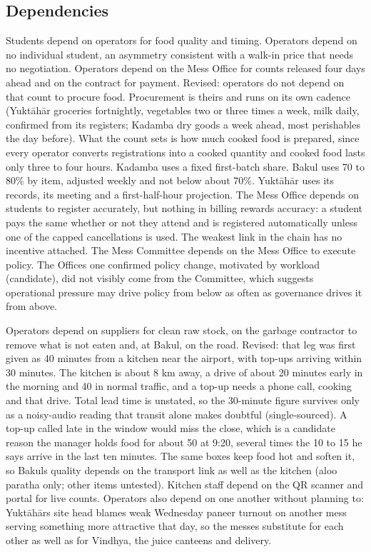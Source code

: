 \documentclass[
  10pt,
  table]{article}
\begin{document}
\subsection{Dependencies}\label{dependencies}

Students depend on operators for food quality and timing. Operators depend on no individual student, an asymmetry consistent with a walk-in price that needs no negotiation. Operators depend on the Mess Office for counts released four days ahead and on the contract for payment. Revised: operators do not depend on that count to procure food. Procurement is theirs and runs on its own cadence (Yuktāhār groceries fortnightly, vegetables two or three times a week, milk daily, confirmed from its registers; Kadamba dry goods a week ahead, most perishables the day before). What the count sets is how much cooked food is prepared, since every operator converts registrations into a cooked quantity and cooked food lasts only three to four hours. Kadamba uses a fixed first-batch share. Bakul uses 70 to 80\% by item, adjusted weekly and not below about 70\%. Yuktāhār uses its records, its meeting and a first-half-hour projection. The Mess Office depends on students to register accurately, but nothing in billing rewards accuracy: a student pays the same whether or not they attend and is registered automatically unless one of the capped cancellations is used. The weakest link in the chain has no incentive attached. The Mess Committee depends on the Mess Office to execute policy. The Office\textquotesingle s one confirmed policy change, motivated by workload (candidate), did not visibly come from the Committee, which suggests operational pressure may drive policy from below as often as governance drives it from above.

Operators depend on suppliers for clean raw stock, on the garbage contractor to remove what is not eaten and, at Bakul, on the road. Revised: that leg was first given as 40 minutes from a kitchen near the airport, with top-ups arriving within 30 minutes. The kitchen is about 8 km away, a drive of about 20 minutes early in the morning and 40 in normal traffic, and a top-up needs a phone call, cooking and that drive. Total lead time is unstated, so the 30-minute figure survives only as a noisy-audio reading that transit alone makes doubtful (single-sourced). A top-up called late in the window would miss the close, which is a candidate reason the manager holds food for about 50 at 9:20, several times the 10 to 15 he says arrive in the last ten minutes. The same boxes keep food hot and soften it, so Bakul\textquotesingle s quality depends on the transport link as well as the kitchen (aloo paratha only; other items untested). Kitchen staff depend on the QR scanner and portal for live counts. Operators also depend on one another without planning to: Yuktāhār\textquotesingle s site head blames weak Wednesday paneer turnout on another mess serving something more attractive that day, so the messes substitute for each other as well as for Vindhya, the juice canteens and delivery.
\end{document}
